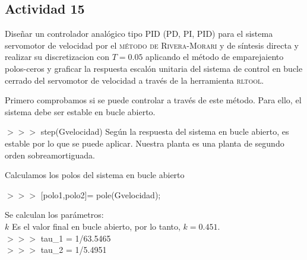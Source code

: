 \newpage
\subsection{Actividad 15}
Diseñar un controlador analógico tipo PID (PD, PI, PID) para el
sistema servomotor de velocidad por el \textsc{método de Rivera-Morari} y de
síntesis directa y realizar su discretizacion con $T=0.05$ aplicando el
método de emparejaiento polos-ceros y graficar la respuesta escalón
unitaria del sistema de control en bucle cerrado del servomotor de
velocidad a través de la herramienta \textsc{rltool}.

\begin{tcolorbox}[sharp corners, colframe=bluebox, title= Controlador
  síntesis directa, breakable=unlimited]
Primero comprobamos si se puede controlar a través de este método. Para ello, 
el sistema debe ser estable en bucle abierto.

 $>>>$ step(Gvelocidad)
Según la respuesta del sistema en bucle abierto, es estable por lo que 
se puede aplicar. Nuestra planta es una planta de segundo orden
sobreamortiguada.

Calculamos los polos del sistema en bucle abierto

$>>>$ [polo1,polo2]= pole(Gvelocidad);

Se calculan los parámetros:\\
$k$ Es el valor final en bucle abierto, por lo tanto, $k = 0.451$.\\
$>>>$ tau\_1 =  1/63.5465\\
$>>>$ tau\_2 =  1/5.4951\\


\end{tcolorbox}
